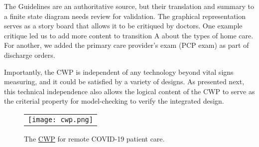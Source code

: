 The Guidelines are an authoritative source, but their translation and summary to a finite state diagram needs review for validation. 
The graphical representation serves as a story board that allows it to be critiqued by doctors. 
One example critique led us to add more content to transition A about the types of home care.  
For another, we added the primary care provider's exam (PCP exam) as part of discharge orders.

Importantly, the CWP is independent of any technology beyond vital signs measuring, and it could be satisfied by a variety of designs.  
As presented next, this technical independence also allows the logical content of the CWP to serve as the criterial property for model-checking to verify the integrated design.

\begin{figure}[t]
  \begin{center}
    \begin{tabular}{c}
      \texttt{[image: cwp.png]}
    \end{tabular}
  \end{center}
\caption{The \href{https://github.com/ericmercer/SPIN-bpmn-cwp-verification-paper/blob/main/26-Oct-2021-CWP.png}{CWP} for remote COVID-19 patient care.}
\label{fig:cwp}
\end{figure}
